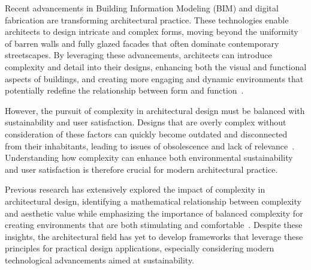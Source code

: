 




Recent advancements in Building Information Modeling (BIM) and digital fabrication are transforming architectural practice.
These technologies enable architects to design intricate and complex forms, moving beyond the uniformity of barren walls and fully glazed facades that often dominate contemporary streetscapes.
By leveraging these advancements, architects can introduce complexity and detail into their designs, enhancing both the visual and functional aspects of buildings, and creating more engaging and dynamic environments that potentially redefine the relationship between form and function~\cite{Gage2015}.

However, the pursuit of complexity in architectural design must be balanced with sustainability and user satisfaction.
Designs that are overly complex without consideration of these factors can quickly become outdated and disconnected from their inhabitants, leading to issues of obsolescence and lack of relevance~\cite{Aesthetic2022}.
Understanding how complexity can enhance both environmental sustainability and user satisfaction is therefore crucial for modern architectural practice.

Previous research has extensively explored the impact of complexity in architectural design, identifying a mathematical relationship between complexity and aesthetic value while emphasizing the importance of balanced complexity for creating environments that are both stimulating and comfortable~\cite{Bies2016, Birkhoff1933, Redies2015}.
Despite these insights, the architectural field has yet to develop frameworks that leverage these principles for practical design applications, especially considering modern technological advancements aimed at sustainability.

